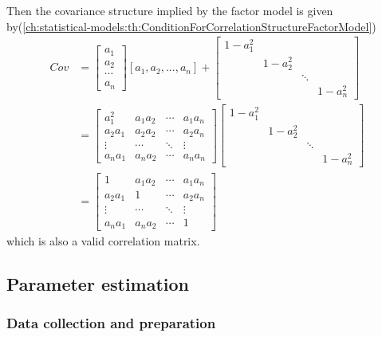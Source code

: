 \begin{refsection}
\begin{example}
Then the covariance structure implied by the factor model is given by(\autoref{ch:statistical-models:th:ConditionForCorrelationStructureFactorModel})
\begin{align*}
Cov &= \begin{bmatrix}
a_1\\
a_2\\
\cdots \\
a_n
\end{bmatrix}[a_1, a_2, ..., a_n] + \begin{bmatrix}
1-a_1^2 &  &  & \\ 
& 1-a_2^2 &  & \\ 
&  & \ddots & \\ 
&  &  & 1-a_n^2
\end{bmatrix} \\
&=\begin{bmatrix}
a_1^2 & a_1a_2 & \cdots & a_1a_n\\ 
a_2a_1 & a_2a_2 & \cdots & a_2a_n\\ 
\vdots & \cdots & \ddots & \vdots\\ 
a_na_1 & a_na_2 & \cdots & a_na_n
\end{bmatrix}\begin{bmatrix}
1-a_1^2 &  &  & \\ 
& 1-a_2^2 &  & \\ 
&  & \ddots & \\ 
&  &  & 1-a_n^2
\end{bmatrix}\\
&=\begin{bmatrix}
1 & a_1a_2 & \cdots & a_1a_n\\ 
a_2a_1 & 1 & \cdots & a_2a_n\\ 
\vdots & \cdots & \ddots & \vdots\\ 
a_na_1 & a_na_2 & \cdots & 1
\end{bmatrix}
\end{align*}
which is also a valid correlation matrix.		
\end{example}


\subsection{Parameter estimation}

\subsubsection{Data collection and preparation}


\end{refsection}
